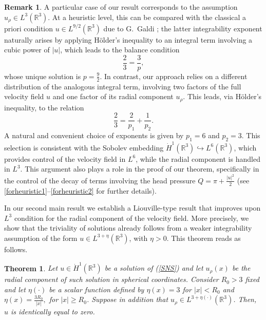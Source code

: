 \documentclass[a4paper,12pt]{amsart}
\theoremstyle{definition}
\newtheorem{remark}{Remark}[section]
\theoremstyle{plain}
\newtheorem{theorem}{Theorem}[section]
\def\vu{ u }
\begin{document}
\begin{remark}
A particular case of our result corresponds to the assumption 
$u_\rho \in L^{3}(\mathbb{R}^3)$. At a heuristic level, this can be compared with the classical 
a priori condition $u \in L^{9/2}(\mathbb{R}^3)$ due to G.~Galdi 
\cite{galdi2011introduction};   
the latter integrability exponent naturally arises by applying Hölder's inequality 
to an integral term involving a cubic power of $|u|$, 
which leads to the balance condition
\[
\frac{2}{3} = \frac{3}{p},
\]
whose unique solution is $p = \frac{9}{2}$.
In contrast, our approach relies on a different distribution of the analogous integral term, 
involving two factors of the full velocity field $u$ and one factor of its radial 
component $u_\rho$. This leads, via Hölder's inequality, to the relation
\[
\frac{2}{3} = \frac{2}{p_1} + \frac{1}{p_2}.
\]
A natural and convenient choice of exponents is given by $p_1 = 6$ and $p_2 = 3$. 
This selection is consistent with the Sobolev embedding 
$\dot H^1(\mathbb{R}^3) \hookrightarrow L^6(\mathbb{R}^3)$, 
which provides control of the velocity field in $L^6$, while the radial 
component is handled in $L^3$. 
This argument also plays a role in the proof of our theorem, specifically in the control of the decay of terms involving the head pressure 
$Q = \pi + \frac{|u|^2}{2}$ (see \eqref{forheuristic1}--\eqref{forheuristic2} for further details).
\end{remark}
 


 


In our second main result we establish a  Liouville-type result that improves upon $L^{3}$ condition for the radial component of the velocity field. More precisely, we show that the triviality of solutions already follows from a weaker integrability assumption of the form $u \in L^{3+\eta}(\mathbb{R}^3)$, with $\eta>0$.  This theorem reads as follows.

  \begin{theorem}\label{thm1.2} 
 Let $\vu  \in \dot{H}^1(\mathbb{R}^3) $ be a solution of (\ref{SNS})
 and let $u_\rho(x)$ be the radial component of such solution in spherical coordinates. 
Consider $R_0>3$ fixed  and let $\eta(\cdot)$ be a scalar function defined by  $\eta(x)=  3 $ for $|x|< R_0$ and $\eta(x)=   \frac{3R_0}{|x|},$ for $|x| \geq  R_0$.  
 Suppose in addition that
 $u_\rho \in L^{3 + \eta(\cdot) }(\mathbb{R}^3)$.
 Then, $u $ is identically equal to zero.
\end{theorem} 
\end{document}
